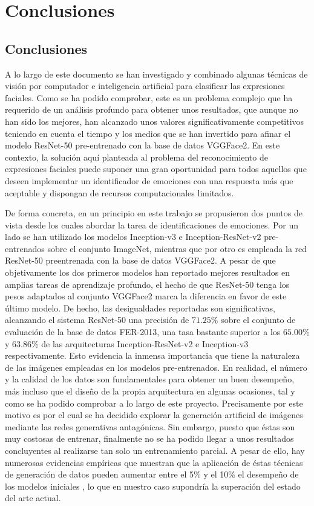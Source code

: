 \chapter{Conclusiones} \label{Chapter:8}

\section{Conclusiones}

A lo largo de este documento se han investigado y combinado algunas técnicas de visión por computador e inteligencia artificial para clasificar las expresiones faciales. Como se ha podido comprobar, este es un problema complejo que ha requerido de un análisis profundo para obtener unos resultados, que aunque no han sido los mejores, han alcanzado unos valores significativamente competitivos teniendo en cuenta el tiempo y los medios que se han invertido para afinar el modelo ResNet-50 pre-entrenado con la base de datos VGGFace2. En este contexto, la solución aquí planteada al problema del reconocimiento de expresiones faciales puede suponer una gran oportunidad para todos aquellos que deseen implementar un identificador de emociones con una respuesta más que aceptable y dispongan de recursos computacionales limitados.

De forma concreta, en un principio en este trabajo se propusieron dos puntos de vista desde los cuales abordar la tarea de identificaciones de emociones. Por un lado se han utilizado los modelos Inception-v3 e Inception-ResNet-v2 pre-entrenados sobre el conjunto ImageNet, mientras que por otro es empleada la red ResNet-50 preentrenada con la base de datos VGGFace2. A pesar de que objetivamente los dos primeros modelos han reportado mejores resultados en amplias tareas de aprendizaje profundo, el hecho de que ResNet-50 tenga los pesos adaptados al conjunto VGGFace2 marca la diferencia en favor de este último modelo. De hecho, las desigualdades reportadas son significativas, alcanzando el sistema ResNet-50 una precisión de $71.25\%$ sobre el conjunto de evaluación de la base de datos FER-2013, una tasa bastante superior a los $65.00\%$ y $63.86\%$ de las arquitecturas Inception-ResNet-v2 e Inception-v3 respectivamente. Esto evidencia la inmensa importancia que tiene la naturaleza de las imágenes empleadas en los modelos pre-entrenados. En realidad, el número y la calidad de los datos son fundamentales para obtener un buen desempeño, más incluso que el diseño de la propia arquitectura en algunas ocasiones, tal y como se ha podido comprobar a lo largo de este proyecto. Precisamente por este motivo es por el cual se ha decidido explorar la generación artificial de imágenes mediante las redes generativas antagónicas. Sin embargo, puesto que éstas son muy costosas de entrenar, finalmente no se ha podido llegar a unos resultados concluyentes al realizarse tan solo un entrenamiento parcial. A pesar de ello, hay numerosas evidencias empíricas que muestran que la aplicación de éstas técnicas de generación de datos pueden aumentar entre el 5\% y el 10\% el desempeño de los modelos iniciales \cite{GANAugmentation}, lo que en nuestro caso supondría la superación del estado del arte actual.

